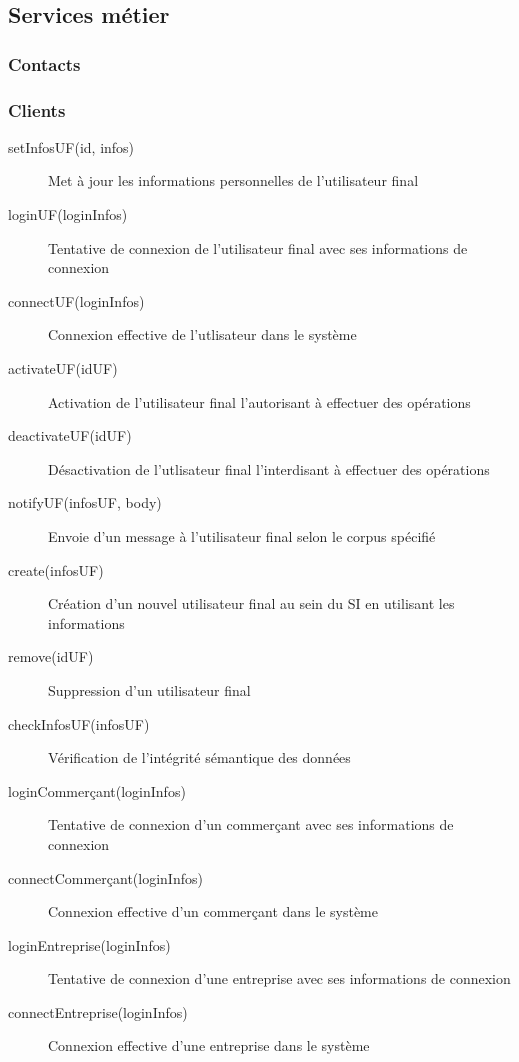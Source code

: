 \subsection{Services métier}
% 


\subsubsection{Contacts}

\subsubsection{Clients}
\begin{description}
  \item[setInfosUF(id, infos)] Met à jour les informations personnelles de l'utilisateur final
  \item[loginUF(loginInfos)] Tentative de connexion de l'utilisateur final avec ses informations de connexion
  \item[connectUF(loginInfos)] Connexion effective de l'utlisateur dans le système
  \item[activateUF(idUF)] Activation de l'utilisateur final l'autorisant à effectuer des opérations
  \item[deactivateUF(idUF)] Désactivation de l'utlisateur final l'interdisant à effectuer des opérations
  \item[notifyUF(infosUF, body)] Envoie d'un message à l'utilisateur final selon le corpus spécifié
  \item[create(infosUF)] Création d'un nouvel utilisateur final au sein du SI en utilisant les informations
  \item[remove(idUF)] Suppression d'un utilisateur final
  \item[checkInfosUF(infosUF)] Vérification de l'intégrité sémantique des données
  \item[loginCommerçant(loginInfos)] Tentative de connexion d'un commerçant avec ses informations de connexion
  \item[connectCommerçant(loginInfos)] Connexion effective d'un commerçant dans le système
  \item[loginEntreprise(loginInfos)] Tentative de connexion d'une entreprise avec ses informations de connexion
  \item[connectEntreprise(loginInfos)] Connexion effective d'une entreprise dans le système
\end{description}

